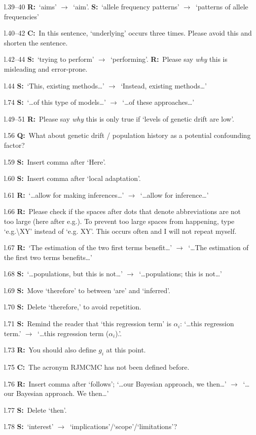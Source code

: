 \documentclass[11pt]{article}
\newenvironment{my_description}
{\begin{description}
  \setlength{\itemsep}{2pt}
  \setlength{\parskip}{0pt}
  \setlength{\parsep}{0pt}}
{\end{description}}
\newcommand{\ra}{$\rightarrow$\ }
\newcommand{\C}{\textbf{C:}\ }
\newcommand{\Q}{\textbf{Q:}\ }
\newcommand{\R}{\textbf{R:}\ }
\newcommand{\V}{\textbf{S:}\ }
\begin{document}
\begin{my_description}
	\item[l.39--40] \R `aims' \ra `aim'. \V `allele frequency patterns' \ra `patterns of allele frequencies'
	\item[l.40--42] \C In this sentence, `underlying' occurs three times. Please avoid this and shorten the sentence.
	\item[l.42--44] \V `trying to perform' \ra `performing'. \R Please say \emph{why} this is misleading and error-prone.
	\item[l.44] \V `This, existing methods\dots' \ra `Instead, existing methods\dots'
	\item[l.74] \V `\dots of this type of models\dots' \ra `\dots of these approaches\dots'
	\item[l.49--51] \R Please say \emph{why} this is only true if `levels of genetic drift are low'.
	\item[l.56] \Q What about genetic drift / population history as a potential confounding factor?
	\item[l.59] \V Insert comma after `Here'.
	\item[l.60] \V Insert comma after `local adaptation'.
	\item[l.61] \R `\dots allow for making inferences\dots' \ra `\dots allow for inference\dots'
	\item[l.66] \R Please check if the spaces after dots that denote abbreviations are not too large (here after e.g.). To prevent too large spaces from happening, type `e.g.\textbackslash XY' instead of `e.g. XY'. This occurs often and I will not repeat myself.
	\item[l.67] \R `The estimation of the two first terms benefit\dots' \ra `\dots The estimation of the first two terms benefits\dots'
	\item[l.68] \V `\dots populations, but this is not\dots' \ra `\dots populations; this is not\dots'
	\item[l.69] \V Move `therefore' to between `are' and `inferred'.
	\item[l.70] \V Delete `therefore,' to avoid repetition.
	\item[l.71] \V Remind the reader that `this regression term' is $\alpha_i$: `\dots this regression term.' \ra `\dots this regression term ($\alpha_i$).'.
	\item[l.73] \R You should also define $g_i$ at this point.
	\item[l.75] \C The acronym RJMCMC has not been defined before.
	\item[l.76] \R Insert comma after `follows'; `\dots our Bayesian approach, we then\dots' \ra `\dots our Bayesian approach. We then\dots'
	\item[l.77] \V Delete `then'.
	\item[l.78] \V `interest' \ra `implications'/`scope'/`limitations'?
		
\end{my_description}
\end{document}
